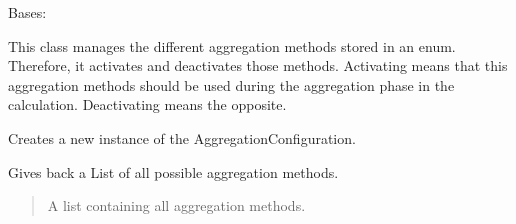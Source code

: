 \documentclass[letterpaper,10pt,english]{sphinxmanual}
\begin{document}
\begin{fulllineitems}
\label{\detokenize{apidoc/src.osm_configurator.model.project.configuration:src.osm_configurator.model.project.configuration.aggregation_configuration.AggregationConfiguration}}
\pysigstartsignatures
{}
\pysigstopsignatures
\sphinxAtStartPar
Bases: 

\sphinxAtStartPar
This class manages the different aggregation methods stored in an enum. Therefore, it activates and deactivates
those methods. Activating means that this aggregation methods should be used during the aggregation phase in the
calculation. Deactivating means the opposite.

\begin{fulllineitems}
\label{\detokenize{apidoc/src.osm_configurator.model.project.configuration:src.osm_configurator.model.project.configuration.aggregation_configuration.AggregationConfiguration.__init__}}
\pysigstartsignatures
{}
\pysigstopsignatures
\sphinxAtStartPar
Creates a new instance of the AggregationConfiguration.

\end{fulllineitems}


\begin{fulllineitems}
\label{\detokenize{apidoc/src.osm_configurator.model.project.configuration:src.osm_configurator.model.project.configuration.aggregation_configuration.AggregationConfiguration.get_all_aggregation_methods}}
\pysigstartsignatures
{}
\pysigstopsignatures
\sphinxAtStartPar
Gives back a List of all possible aggregation methods.
\begin{quote}\begin{description}
\sphinxAtStartPar
A list containing all aggregation methods.

\sphinxAtStartPar
{}


\end{description}
\end{quote}
\end{fulllineitems}
\end{fulllineitems}
\end{document}
